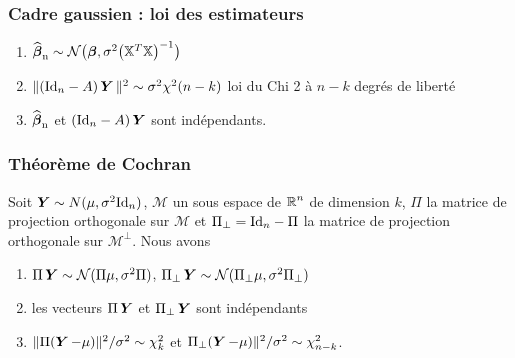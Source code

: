 
\begin{frame}
\frametitle{Cadre gaussien : loi des estimateurs}
\begin{prop}
\begin{enumerate}
\item  $\operatorname{\widehat{\boldsymbol{\beta}}_n} \sim {\mathcal N}\big(\boldsymbol{\beta}, \sigma^2 \big(\mathbb{X}^T\mathbb{X}\big)^{-1}\big)$
\item  $\|(\mathrm{Id}_{n} - A) \operatorname{\boldsymbol{Y}} \|^2 \sim
\sigma^2\chi^2(n-k)$ \alert{ loi du Chi 2 à $n-k$ degrés de liberté}
\item  $\operatorname{\widehat{\boldsymbol{\beta}}_n}$ et $(\mathrm{Id}_{n} - A) \operatorname{\boldsymbol{Y}}$ sont indépendants.
\end{enumerate}
\end{prop}
\end{frame}

\begin{frame}
\frametitle{Théorème de Cochran}
\begin{theo}
Soit $\operatorname{\boldsymbol{Y}} \sim N(\mu,\sigma^2 \mathrm{Id}_{n})$, $\mathcal{M}$ un sous espace de $\operatorname{{\mathbb R}}^n$ de dimension $k$, $\Pi$ la matrice de projection orthogonale
sur $\mathcal{M}$ et $\Pi_{\perp}= \mathrm{Id}_{n} - \Pi$ la matrice de projection orthogonale sur $\mathcal{M}^\perp$. Nous avons
\begin{enumerate}
\item \alert<1>{$\Pi \operatorname{\boldsymbol{Y}} \sim \mathcal{N}(\Pi \mu, \sigma^2 \Pi)$, $\Pi_\perp \operatorname{\boldsymbol{Y}} \sim \mathcal{N}(\Pi_{\perp} \mu, \sigma^2 \Pi_{\perp})$}
\item \alert<2>{les vecteurs $\Pi \operatorname{\boldsymbol{Y}}$ et $\Pi_\perp \operatorname{\boldsymbol{Y}}$ sont indépendants}
\item \alert<3>{$\| \Pi(\operatorname{\boldsymbol{Y}} - \mu) \|^2 / \sigma^2 \sim \chi^2_k$ et $\Pi_\perp(\operatorname{\boldsymbol{Y}}-\mu) \|^2/\sigma^2 \sim \chi^2_{n-k}$}.
\end{enumerate}
\end{theo}
\end{frame}

